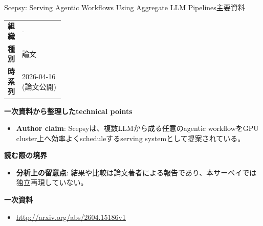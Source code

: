 \begin{technicalnote}{Scepsy: Serving Agentic Workflows Using Aggregate LLM Pipelines}{主要資料}
\begingroup
\begin{tabularx}{\linewidth}{@{}>{\bfseries}p{0.22\linewidth}X@{}}
組織 & - \\
種別 & 論文 \\
時系列 & 2026-04-16 (論文公開) \\
\end{tabularx}
\smallskip
{\bfseries 一次資料から整理したtechnical points}
\begin{itemize}[leftmargin=1.5em,itemsep=0.35em]
\item \textbf{Author claim}: Scepsyは、複数LLMから成る任意のagentic workflowをGPU cluster上へ効率よくscheduleするserving systemとして提案されている。
\end{itemize}
\begin{minipage}{\linewidth}
{\bfseries 読む際の境界}
\begin{itemize}[leftmargin=1.5em,itemsep=0.35em]
\item \textbf{分析上の留意点}: 結果や比較は論文著者による報告であり、本サーベイでは独立再現していない。
\end{itemize}
\begin{samepage}
{\bfseries 一次資料}
\begingroup\sloppy
\begin{itemize}[leftmargin=1.5em,itemsep=0.25em]
\item {\scriptsize\url{http://arxiv.org/abs/2604.15186v1}}
\end{itemize}
\endgroup
\end{samepage}
\end{minipage}
\endgroup
\end{technicalnote}
\medskip

